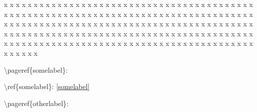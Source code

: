 \documentclass[a5paper]{article}
\begin{document}
\linenumbers

\clearpage\mbox{}\clearpage

\label{somelabel}
\lipsum[1]



x x x x x x x x x x x x x x x x x x x x x x x x x x x x x x x x x x x x x x x x x x x x x x x x x x x x x x
x x x x x x x x x x x x x x x x x x x x x x x x x x x x x x x x x x x x x x x x x x x x x x x x x x x x x x
x x x x x x x x x x x x x x x x x x x x x x x x x x x x x x x x x x x x x x x x x x x x x x x x x x x x x x
x x x x x x x x x x x x x x x x x x x x x x x x x x x x x x x x x x x x x x x x x x x x x x x x x x x x x x

\textbackslash{}pageref\{somelabel\}: \pageref{somelabel}

\textbackslash{}ref\{somelabel\}: \ref{somelabel}

\textbackslash{}pageref\{otherlabel\}: \pageref{otherlabel}

\currfilename

\clearpage
\label{otherlabel}


\jobname

\end{document}

